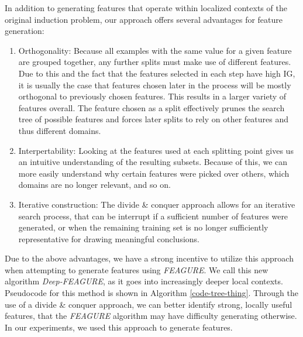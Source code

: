 \documentclass[twoside,11pt]{article}
\theoremstyle{definition}
\begin{document}
In addition to generating features that operate within localized contexts of the original induction problem, our approach offers several advantages for feature generation:
\begin{enumerate}
	\item Orthogonality: Because all examples with the same value for a given feature are grouped together, any further splits must make use of different features. Due to this and the fact that the features selected in each step have high IG, it is usually the case that features chosen later in the process will be mostly orthogonal to previously chosen features. This results in a larger variety of features overall. The feature chosen as a split effectively prunes the search tree of possible features and forces later splits to rely on other features and thus different domains.
	\item Interpertability: Looking at the features used at each splitting point gives us an intuitive understanding of the resulting subsets. Because of this, we can more easily understand why certain features were picked over others, which domains are no longer relevant, and so on.
	\item Iterative construction: The divide \& conquer approach allows for an iterative search process, that can be interrupt if a sufficient number of features were generated, or when the remaining training set is no longer sufficiently representative for drawing meaningful conclusions.
\end{enumerate}

Due to the above advantages, we have a strong incentive to utilize this approach when attempting to generate features using \emph{FEAGURE}. 
We call this new algorithm \emph{Deep-FEAGURE}, as it goes into increasingly deeper local contexts. 
Pseudocode for this method is shown in Algorithm \ref{code-tree-thing}.
Through the use of a divide \& conquer approach, we can better identify strong, locally useful features, that the \emph{FEAGURE} algorithm may have difficulty generating otherwise. In our experiments, we used this approach to generate features.
\end{document}
